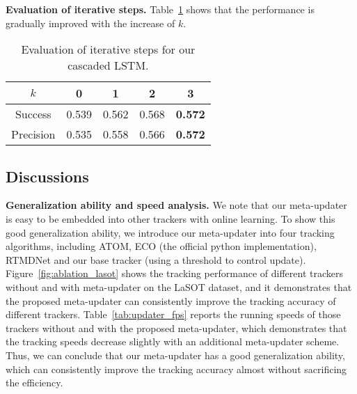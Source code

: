 \documentclass[10pt,twocolumn,letterpaper]{article}
\begin{document}
\noindent \textbf{Evaluation of iterative steps.}
Table~\ref{tab:ablationk} shows that the performance is gradually improved with the increase of $k$.

\begin{table}[h]
\vspace{-2mm}
\caption{Evaluation of iterative steps for our cascaded LSTM.}
\vspace{-3mm}
\small
\label{tab:ablationk}
\begin{center}
\begin{tabular}{ccccc}
\hline
$k$         & 0     & 1     & 2    & 3                                     \\
\hline
Success      & 0.539 & 0.562 & {\color[HTML]{000000} 0.568} & {\color[HTML]{FE0000} \textbf{0.572}} \\
Precision    & 0.535 & 0.558 & {\color[HTML]{000000} 0.566} & {\color[HTML]{FE0000} \textbf{0.572}}\\
\hline
\end{tabular}
\end{center}
\vspace{-8mm}
\end{table}

\subsection{Discussions}
\vspace{-2mm}
\label{sec-ga}
\noindent \textbf{Generalization ability and speed analysis.} We note that our meta-updater is easy to be embedded
into other trackers with online learning. To show this good generalization ability, we introduce our meta-updater into
four tracking algorithms, including ATOM, ECO (the official python implementation), RTMDNet and our base tracker
(using a threshold to control update).
Figure~\ref{fig:ablation_lasot} shows the tracking performance of different trackers without and with meta-updater
on the LaSOT dataset, and it demonstrates that the proposed meta-updater can consistently improve the tracking
accuracy of different trackers.
Table~\ref{tab:updater_fps} reports the running speeds of those trackers without and with the proposed meta-updater,
which demonstrates that the tracking speeds decrease slightly with an additional meta-updater scheme.
Thus, we can conclude that our meta-updater has a good generalization ability, which can consistently improve
the tracking accuracy almost without sacrificing the efficiency.
\end{document}
